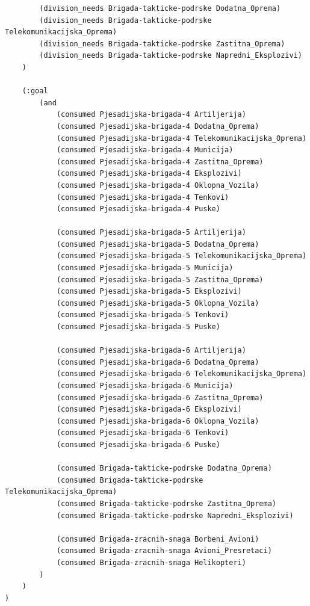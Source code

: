 \documentclass{article}
\begin{document}
\begin{verbatim}
        (division_needs Brigada-takticke-podrske Dodatna_Oprema)
        (division_needs Brigada-takticke-podrske Telekomunikacijska_Oprema)
        (division_needs Brigada-takticke-podrske Zastitna_Oprema)
        (division_needs Brigada-takticke-podrske Napredni_Eksplozivi)
    )

    (:goal
        (and
            (consumed Pjesadijska-brigada-4 Artiljerija)
            (consumed Pjesadijska-brigada-4 Dodatna_Oprema)
            (consumed Pjesadijska-brigada-4 Telekomunikacijska_Oprema)
            (consumed Pjesadijska-brigada-4 Municija)
            (consumed Pjesadijska-brigada-4 Zastitna_Oprema)
            (consumed Pjesadijska-brigada-4 Eksplozivi)
            (consumed Pjesadijska-brigada-4 Oklopna_Vozila)
            (consumed Pjesadijska-brigada-4 Tenkovi)
            (consumed Pjesadijska-brigada-4 Puske)
            
            (consumed Pjesadijska-brigada-5 Artiljerija)
            (consumed Pjesadijska-brigada-5 Dodatna_Oprema)
            (consumed Pjesadijska-brigada-5 Telekomunikacijska_Oprema)
            (consumed Pjesadijska-brigada-5 Municija)
            (consumed Pjesadijska-brigada-5 Zastitna_Oprema)
            (consumed Pjesadijska-brigada-5 Eksplozivi)
            (consumed Pjesadijska-brigada-5 Oklopna_Vozila)
            (consumed Pjesadijska-brigada-5 Tenkovi)
            (consumed Pjesadijska-brigada-5 Puske)
            
            (consumed Pjesadijska-brigada-6 Artiljerija)
            (consumed Pjesadijska-brigada-6 Dodatna_Oprema)
            (consumed Pjesadijska-brigada-6 Telekomunikacijska_Oprema)
            (consumed Pjesadijska-brigada-6 Municija)
            (consumed Pjesadijska-brigada-6 Zastitna_Oprema)
            (consumed Pjesadijska-brigada-6 Eksplozivi)
            (consumed Pjesadijska-brigada-6 Oklopna_Vozila)
            (consumed Pjesadijska-brigada-6 Tenkovi)
            (consumed Pjesadijska-brigada-6 Puske)
            
            (consumed Brigada-takticke-podrske Dodatna_Oprema)
            (consumed Brigada-takticke-podrske Telekomunikacijska_Oprema)
            (consumed Brigada-takticke-podrske Zastitna_Oprema)
            (consumed Brigada-takticke-podrske Napredni_Eksplozivi)
            
            (consumed Brigada-zracnih-snaga Borbeni_Avioni)
            (consumed Brigada-zracnih-snaga Avioni_Presretaci)
            (consumed Brigada-zracnih-snaga Helikopteri)
        )
    )
)
\end{verbatim}
\end{document}
